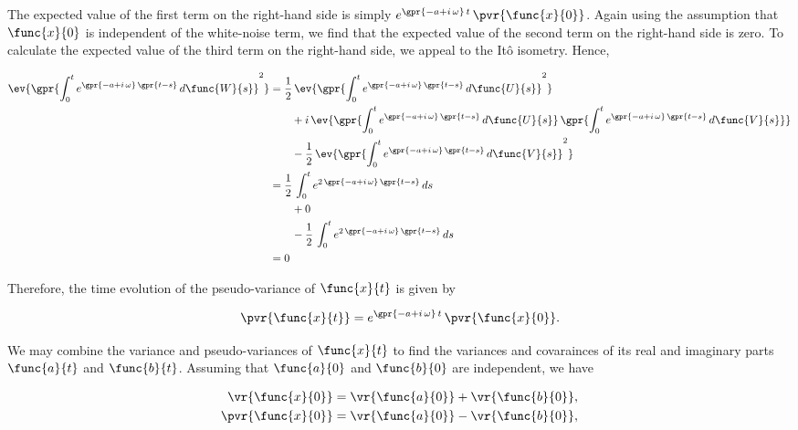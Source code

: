 The expected value of the first term on the right-hand side is simply $e^{\gpr{-a + i\,\omega}\,t}\,\pvr{\func{x}{0}}$. Again using the assumption that $\func{x}{0}$ is independent of the white-noise term, we find that the expected value of the second term on the right-hand side is zero. To calculate the expected value of the third term on the right-hand side, we appeal to the It\^{o} isometry. Hence,

\begin{align}
	\ev{\gpr{\int_{0}^{t} e^{\gpr{-a + i\,\omega}\,\gpr{t - s}}\,d\func{W}{s}}^2} &= \frac{1}{2}\,\ev{\gpr{\int_{0}^{t} e^{\gpr{-a + i\,\omega}\,\gpr{t - s}}\,d\func{U}{s}}^2} \nonumber \\
			&\qquad + i\,\ev{\gpr{\int_{0}^{t} e^{\gpr{-a + i\,\omega}\,\gpr{t - s}}\,d\func{U}{s}}\,\gpr{\int_{0}^{t} e^{\gpr{-a + i\,\omega}\,\gpr{t - s}}\,d\func{V}{s}}} \nonumber \\
			&\qquad - \frac{1}{2}\,\ev{\gpr{\int_{0}^{t} e^{\gpr{-a + i\,\omega}\,\gpr{t - s}}\,d\func{V}{s}}^2} \nonumber \\
		&= \frac{1}{2}\,\int_{0}^{t} e^{2\,\gpr{-a + i\,\omega}\,\gpr{t - s}}\,ds \nonumber \\
			&\qquad + 0 \nonumber \\
			&\qquad - \frac{1}{2}\,\int_{0}^{t} e^{2\,\gpr{-a + i\,\omega}\,\gpr{t - s}}\,ds \nonumber \\
		&= 0
\end{align}

Therefore, the time evolution of the pseudo-variance of $\func{x}{t}$ is given by

\begin{equation}
	\pvr{\func{x}{t}} = e^{\gpr{-a + i\,\omega}\,t}\,\pvr{\func{x}{0}}.
\end{equation}

We may combine the variance and pseudo-variances of $\func{x}{t}$ to find the variances and covarainces of its real and imaginary parts $\func{a}{t}$ and $\func{b}{t}$. Assuming that $\func{a}{0}$ and $\func{b}{0}$ are independent, we have 

\begin{subequations}
	\begin{align}
		\vr{\func{x}{0}} &= \vr{\func{a}{0}} + \vr{\func{b}{0}}, \\
		\pvr{\func{x}{0}} &= \vr{\func{a}{0}} - \vr{\func{b}{0}},
	\end{align}
\end{subequations}

